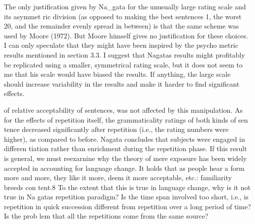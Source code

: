 \setcounter{listWWNumxxxiileveli}{5}
\begin{listWWNumxxxiileveli}
\item 
\begin{styleStandard}
The only justification given by Na\_gata for the unusually large rating scale and its asymmet\- ric division (as opposed to making the best sentences 1, the worst 20, and the remainder evenly spread in between) is that the same scheme was used by Moore (1972). But Moore himself gives no justification for these choices. I can only speculate that they might have been inspired by the psycho\- metric results mentioned in section 3.3. I suggest that Nagata{\textquotesingle}s results might profitably be replicated using a smaller, symmetrical rating scale, but it does not seem to me that his scale would have biased the results. If anything, the large scale should increase variability in the results and make it harder to find significant effects.
\end{styleStandard}


\end{listWWNumxxxiileveli}
\clearpage\setcounter{page}{1}\begin{styleTextbody}
of relative acceptability of sentences, was not affected by this manipulation. As for the effects of repetition itself, the grammaticality ratings of both kinds of sen\- tence decreased significantly after repetition (i.e., the rating numbers were higher), as compared to before. Nagata concludes that subjects were engaged in differen\- tiation rather than enrichment during the repetition phase. If this result is general, we must reexarnine why the theory of mere exposure has been widely accepted in accounting for language change. It holds that as people hear a form more and more, they like it more, deem it more acceptable, etc.: {\textquotedbl}familiarity breeds con\- tent.{\textquotedbl}8 To the extent that this is true in language change, why is it not true in Na\- gata{\textquotesingle}s repetition paradigm? Is the time span involved too short, i.e., is repetition in quick succession different from repetition over a long period of time? Is the prob\- lem that all the repetitions come from the same source?
\end{styleTextbody}


